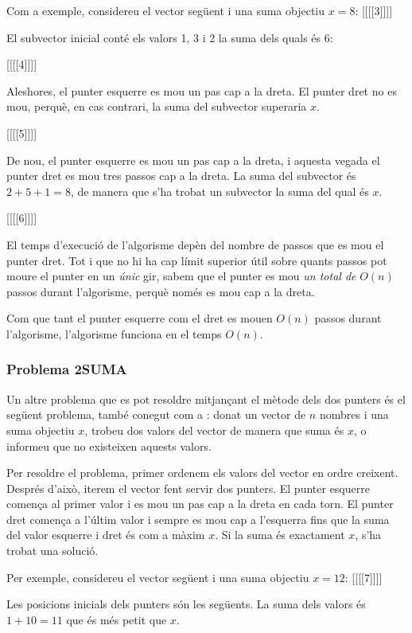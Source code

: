 Com a exemple, considereu el vector següent i una suma objectiu $x=8$:
[[[[3]]]]


El subvector inicial conté els valors 1, 3 i 2 la suma dels quals és 6:


[[[[4]]]]


Aleshores, el punter esquerre es mou un pas cap a la dreta. El punter
dret no es mou, perquè, en cas contrari, la suma del subvector
superaria $x$.


[[[[5]]]]


De nou, el punter esquerre es mou un pas cap a la dreta, i aquesta
vegada el punter dret es mou tres passos cap a la dreta. La suma del
subvector és $2+5+1=8$, de manera que s'ha trobat un subvector la suma
del qual és $x$.


[[[[6]]]]


El temps d'execució de l'algorisme depèn del nombre de passos que es
mou el punter dret. Tot i que no hi ha cap límit superior útil sobre
quants passos pot moure el punter en un \emph{únic} gir, sabem que el
punter es mou \emph{un total de} $O(n)$ passos durant l'algorisme, perquè
només es mou cap a la dreta.

Com que tant el punter esquerre com el dret es mouen $O(n)$ passos durant
l'algorisme, l'algorisme funciona en el temps $O(n)$.

\subsubsection{Problema 2SUMA}


Un altre problema que es pot resoldre mitjançant el mètode dels dos
punters és el següent problema, també conegut com a :
donat un vector de $n$ nombres i una suma objectiu $x$,
trobeu dos valors del vector de manera que suma és $x$, o informeu que
no existeixen aquests valors.

Per resoldre el problema, primer ordenem els valors del vector en
ordre creixent. Després d'això, iterem el vector fent servir dos
punters. El punter esquerre comença al primer valor i es mou un pas
cap a la dreta en cada torn. El punter dret comença a l'últim valor i
sempre es mou cap a l'esquerra fins que la suma del valor esquerre i
dret és com a màxim $x$. Si la suma és exactament $x$, s'ha trobat una
solució.

Per exemple, considereu el vector següent i una suma objectiu $x=12$:
[[[[7]]]]


Les posicions inicials dels punters són les següents. La suma dels
valors és $1+10=11$ que és més petit que $x$.


